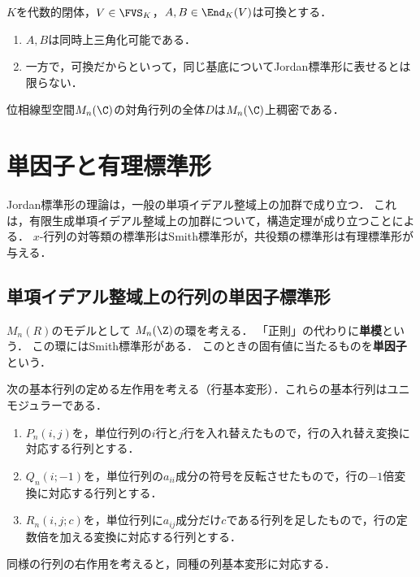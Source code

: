 \documentclass[uplatex, dvipdfmx]{jsreport}
\begin{document}
\begin{proposition}[同時Jordan行列化は必ずしも可能でない]
    $K$を代数的閉体，$V\in\FVS_K$，$A,B\in\End_K(V)$は可換とする．
    \begin{enumerate}
        \item $A,B$は同時上三角化可能である．
        \item 一方で，可換だからといって，同じ基底についてJordan標準形に表せるとは限らない．
    \end{enumerate}
\end{proposition}

\begin{proposition}
    位相線型空間$M_n(\C)$の対角行列の全体$D$は$M_n(\C)$上稠密である．
\end{proposition}

\section{単因子と有理標準形}

\begin{tcolorbox}[colframe=ForestGreen, colback=ForestGreen!10!white,breakable,colbacktitle=ForestGreen!40!white,coltitle=black,fonttitle=\bfseries\sffamily,
title=]
    Jordan標準形の理論は，一般の単項イデアル整域上の加群で成り立つ．
    これは，有限生成単項イデアル整域上の加群について，構造定理が成り立つことによる．
    $x$-行列の対等類の標準形はSmith標準形が，共役類の標準形は有理標準形が与える．
\end{tcolorbox}

\subsection{単項イデアル整域上の行列の単因子標準形}

\begin{tcolorbox}[colframe=ForestGreen, colback=ForestGreen!10!white,breakable,colbacktitle=ForestGreen!40!white,coltitle=black,fonttitle=\bfseries\sffamily,
title=]
    $M_n(R)$のモデルとして
    $M_n(\Z)$の環を考える．
    「正則」の代わりに\textbf{単模}という．
    この環にはSmith標準形がある．
    このときの固有値に当たるものを\textbf{単因子}という．
\end{tcolorbox}

\begin{notation}
    次の基本行列の定める左作用を考える（行基本変形）．これらの基本行列はユニモジュラーである．
    \begin{enumerate}
        \item $P_n(i,j)$を，単位行列の$i$行と$j$行を入れ替えたもので，行の入れ替え変換に対応する行列とする．
        \item $Q_n(i;-1)$を，単位行列の$a_{ii}$成分の符号を反転させたもので，行の$-1$倍変換に対応する行列とする．
        \item $R_n(i,j;c)$を，単位行列に$a_{ij}$成分だけ$c$である行列を足したもので，行の定数倍を加える変換に対応する行列とする．
    \end{enumerate}
    同様の行列の右作用を考えると，同種の列基本変形に対応する．
\end{notation}
\end{document}
